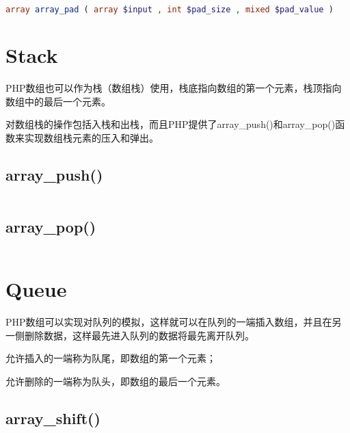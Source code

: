 \begin{lstlisting}[language=PHP]
array array_pad ( array $input , int $pad_size , mixed $pad_value )
\end{lstlisting}

\section{Stack}

PHP数组也可以作为栈（数组栈）使用，栈底指向数组的第一个元素，栈顶指向数组中的最后一个元素。

对数组栈的操作包括入栈和出栈，而且PHP提供了array\_push()和array\_pop()函数来实现数组栈元素的压入和弹出。

\subsection{array\_push()}


\begin{lstlisting}[language=PHP]

\end{lstlisting}


\subsection{array\_pop()}



\begin{lstlisting}[language=PHP]

\end{lstlisting}



\section{Queue}



PHP数组可以实现对队列的模拟，这样就可以在队列的一端插入数组，并且在另一侧删除数据，这样最先进入队列的数据将最先离开队列。

\begin{compactitem}
\item 允许插入的一端称为队尾，即数组的第一个元素；
\item 允许删除的一端称为队头，即数组的最后一个元素。
\end{compactitem}


\subsection{array\_shift()}



